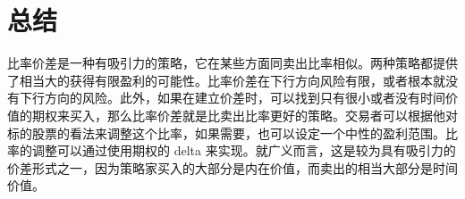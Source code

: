 \section{总结}
比率价差是一种有吸引力的策略，它在某些方面同卖出比率相似。两种策略都提供了相当大的获得有限盈利的可能性。比率价差在下行方向风险有限，或者根本就没有下行方向的风险。此外，如果在建立价差时，可以找到只有很小或者没有时间价值的期权来买入，那么比率价差就是比卖出比率更好的策略。交易者可以根据他对标的股票的看法来调整这个比率，如果需要，也可以设定一个中性的盈利范围。比率的调整可以通过使用期权的 delta 来实现。就广义而言，这是较为具有吸引力的价差形式之一，因为策略家买入的大部分是内在价值，而卖出的相当大部分是时间价值。